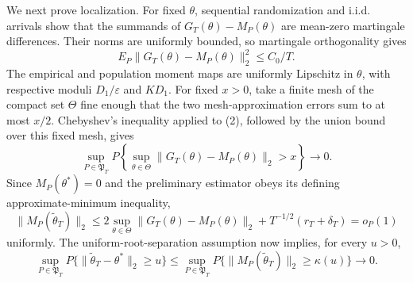 We next prove localization. For fixed \(\theta\), sequential randomization and i.i.d. arrivals show that the summands of \(G_T(\theta)-M_P(\theta)\) are mean-zero martingale differences. Their norms are uniformly bounded, so martingale orthogonality gives
\[
 E_P\|G_T(\theta)-M_P(\theta)\|_2^2\le C_0/T.
\tag{2}
\]
The empirical and population moment maps are uniformly Lipschitz in \(\theta\), with respective moduli \(D_1/\varepsilon\) and \(KD_1\). For fixed \(x>0\), take a finite mesh of the compact set \(\Theta\) fine enough that the two mesh-approximation errors sum to at most \(x/2\). Chebyshev's inequality applied to (2), followed by the union bound over this fixed mesh, gives
\[
 \sup_{P\in\mathfrak P_T}P\left\{\sup_{\theta\in\Theta}
 \|G_T(\theta)-M_P(\theta)\|_2>x\right\}\longrightarrow0.
\tag{3}
\]
Since \(M_P(\theta^*)=0\) and the preliminary estimator obeys its defining approximate-minimum inequality,
\[
 \|M_P(\widetilde\theta_T)\|_2
 \le2\sup_{\theta\in\Theta}\|G_T(\theta)-M_P(\theta)\|_2
 +T^{-1/2}(r_T+\delta_T)=o_P(1)
\]
uniformly. The uniform-root-separation assumption now implies, for every \(u>0\),
\[
 \sup_{P\in\mathfrak P_T}P\{\|\widetilde\theta_T-\theta^*\|_2\ge u\}
 \le\sup_{P\in\mathfrak P_T}P\{\|M_P(\widetilde\theta_T)\|_2\ge\kappa(u)\}
 \longrightarrow0.
\tag{4}
\]

